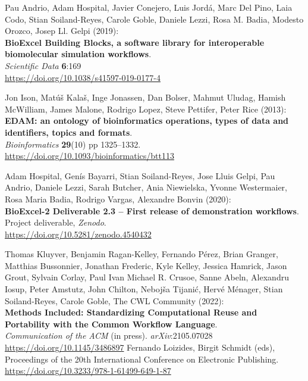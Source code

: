 \begin{thebibliography}{9}
Pau Andrio, Adam Hospital, Javier Conejero, Luis Jordá, Marc
Del Pino, Laia Codo, Stian Soiland-Reyes, Carole Goble, Daniele Lezzi,
Rosa M. Badia, Modesto Orozco, Josep Ll. Gelpi (2019):\\
\textbf{BioExcel Building Blocks, a software library for interoperable
biomolecular simulation workflows}.\\
\emph{Scientific Data} \textbf{6}:169\\
\url{https://doi.org/10.1038/s41597-019-0177-4}

Jon Ison, Matúš Kalaš, Inge Jonassen, Dan Bolser, Mahmut
Uludag, Hamish McWilliam, James Malone, Rodrigo Lopez, Steve Pettifer,
Peter Rice (2013):\\
\textbf{EDAM: an ontology of bioinformatics operations, types of data
and identifiers, topics and formats}.\\
\emph{Bioinformatics} \textbf{29}(10) pp 1325--1332.\\
\url{https://doi.org/10.1093/bioinformatics/btt113}

Adam Hospital, Genís Bayarri, Stian Soiland-Reyes, Jose Lluis
Gelpi, Pau Andrio, Daniele Lezzi, Sarah Butcher, Ania Niewielska, Yvonne
Westermaier, Rosa Maria Badia, Rodrigo Vargas, Alexandre Bonvin
(2020):\\
\textbf{BioExcel-2 Deliverable 2.3 -- First release of demonstration
workflows}.\\
Project deliverable, \emph{Zenodo}.\\
\url{https://doi.org/10.5281/zenodo.4540432}

Thomas Kluyver, Benjamin Ragan-Kelley, Fernando Pérez, Brian
Granger, Matthias Bussonnier, Jonathan Frederic, Kyle Kelley, Jessica
Hamrick, Jason Grout, Sylvain Corlay, Paul Ivan
Michael R. Crusoe, Sanne Abeln, Alexandru Iosup, Peter Amstutz,
John Chilton, Nebojša Tijanić, Hervé Ménager, Stian Soiland-Reyes,
Carole Goble, The CWL Community (2022):\\
\textbf{Methods Included: Standardizing Computational Reuse and
Portability with the Common Workflow Language}.\\
\emph{Communication of the ACM} (in press). \emph{arXiv}:2105.07028\\
\url{https://doi.org/10.1145/3486897}
Fernando Loizides, Birgit Schmidt (eds), Proceedings of the 20th International Conference on Electronic Publishing.\\
\url{https://doi.org/10.3233/978-1-61499-649-1-87}


\end{thebibliography}
